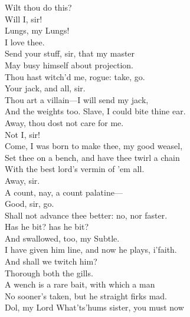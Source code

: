 \documentclass[a4paper,oneside]{memoir}
\begin{document}
\begin{drama*}
\mammonspeaks Wilt thou do this?\\
\facespeaks {} Will I, sir!\\
\mammonspeaks {} Lungs, my Lungs!\\
I love thee.\\
\facespeaks {} Send your stuff, sir, that my master\\
May busy himself about projection.\\
\mammonspeaks Thou hast witch'd me, rogue: take, go.\\
\facespeaks {} Your jack, and all, sir.\\
\mammonspeaks Thou art a villain---I will send my jack,\\
And the weights too. Slave, I could bite thine ear.\\
Away, thou dost not care for me.\\
\facespeaks {} Not I, sir!\\
\mammonspeaks Come, I was born to make thee, my good weasel,\\
Set thee on a bench, and have thee twirl a chain\\
With the best lord's vermin of 'em all.\\
\facespeaks {} Away, sir.\\
\mammonspeaks A count, nay, a count palatine---\\
\facespeaks {} Good, sir, go.\\
\mammonspeaks Shall not advance thee better: no, nor faster.\\
\subtlespeaks Has he bit? has he bit?\\
\facespeaks {} And swallowed, too, my Subtle.\\
I have given him line, and now he plays, i'faith.\\
\subtlespeaks And shall we twitch him?\\
\facespeaks {} Thorough both the gills.\\
A wench is a rare bait, with which a man\\
No sooner's taken, but he straight firks mad.\\
\subtlespeaks Dol, my Lord What'ts'hums sister, you must now\\

\end{drama*}
\end{document}
